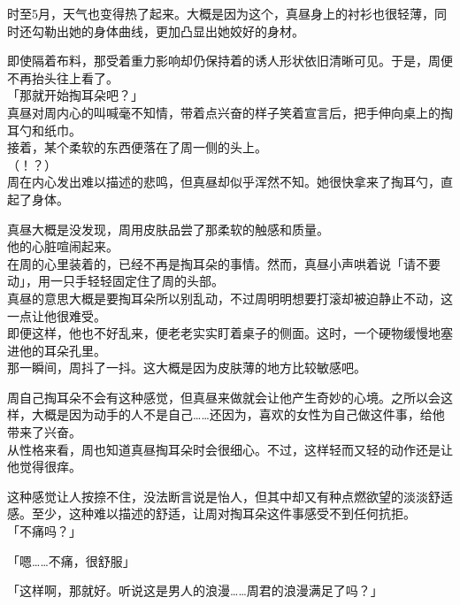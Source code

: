 时至5月，天气也变得热了起来。大概是因为这个，真昼身上的衬衫也很轻薄，同时还勾勒出她的身体曲线，更加凸显出她姣好的身材。

即使隔着布料，那受着重力影响却仍保持着的诱人形状依旧清晰可见。于是，周便不再抬头往上看了。\\

「那就开始掏耳朵吧？」\\

真昼对周内心的叫喊毫不知情，带着点兴奋的样子笑着宣言后，把手伸向桌上的掏耳勺和纸巾。\\

接着，某个柔软的东西便落在了周一侧的头上。\\

（！？）\\

周在内心发出难以描述的悲鸣，但真昼却似乎浑然不知。她很快拿来了掏耳勺，直起了身体。

真昼大概是没发现，周用皮肤品尝了那柔软的触感和质量。\\

他的心脏喧闹起来。\\

在周的心里装着的，已经不再是掏耳朵的事情。然而，真昼小声哄着说「请不要动」，用一只手轻轻固定住了周的头部。\\

真昼的意思大概是要掏耳朵所以别乱动，不过周明明想要打滚却被迫静止不动，这一点让他很难受。\\

即便这样，他也不好乱来，便老老实实盯着桌子的侧面。这时，一个硬物缓慢地塞进他的耳朵孔里。\\

那一瞬间，周抖了一抖。这大概是因为皮肤薄的地方比较敏感吧。

周自己掏耳朵不会有这种感觉，但真昼来做就会让他产生奇妙的心境。之所以会这样，大概是因为动手的人不是自己……还因为，喜欢的女性为自己做这件事，给他带来了兴奋。\\

从性格来看，周也知道真昼掏耳朵时会很细心。不过，这样轻而又轻的动作还是让他觉得很痒。

这种感觉让人按捺不住，没法断言说是怡人，但其中却又有种点燃欲望的淡淡舒适感。至少，这种难以描述的舒适，让周对掏耳朵这件事感受不到任何抗拒。\\

「不痛吗？」

「嗯……不痛，很舒服」

「这样啊，那就好。听说这是男人的浪漫……周君的浪漫满足了吗？」

